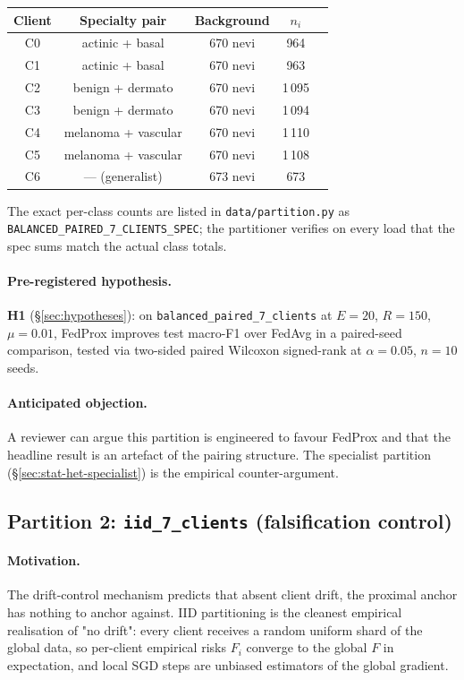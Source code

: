 \begin{center}
\begin{tabular}{ccccc}
\toprule
Client & Specialty pair & Background & $n_i$ \\
\midrule
C0 & actinic + basal      &  670 nevi & 964 \\
C1 & actinic + basal      &  670 nevi & 963 \\
C2 & benign + dermato     &  670 nevi & 1\,095 \\
C3 & benign + dermato     &  670 nevi & 1\,094 \\
C4 & melanoma + vascular  &  670 nevi & 1\,110 \\
C5 & melanoma + vascular  &  670 nevi & 1\,108 \\
C6 & --- (generalist)     &  673 nevi & 673 \\
\bottomrule
\end{tabular}
\end{center}

The exact per-class counts are listed in
\texttt{data/partition.py} as \texttt{BALANCED\_PAIRED\_7\_CLIENTS\_SPEC};
the partitioner verifies on every load that the spec sums match the
actual class totals.

\paragraph{Pre-registered hypothesis.}
\textbf{H1} (\S\ref{sec:hypotheses}): on \texttt{balanced\_paired\_7\_clients}
at $E=20$, $R=150$, $\mu=0.01$, FedProx improves test macro-F1 over
FedAvg in a paired-seed comparison, tested via two-sided paired
Wilcoxon signed-rank at $\alpha = 0.05$, $n = 10$ seeds.

\paragraph{Anticipated objection.}
A reviewer can argue this partition is engineered to favour FedProx
and that the headline result is an artefact of the pairing structure.
The specialist partition (\S\ref{sec:stat-het-specialist}) is the
empirical counter-argument.

\subsection{Partition 2: \texttt{iid\_7\_clients} (falsification control)}
\label{sec:stat-het-iid}

\paragraph{Motivation.}
The drift-control mechanism predicts that absent client drift, the
proximal anchor has nothing to anchor against. IID partitioning is
the cleanest empirical realisation of "no drift": every client
receives a random uniform shard of the global data, so per-client
empirical risks $F_i$ converge to the global $F$ in expectation, and
local SGD steps are unbiased estimators of the global gradient.

